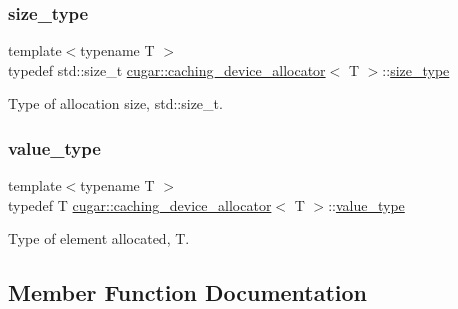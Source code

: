 \subsubsection{\texorpdfstring{size\+\_\+type}{size\_type}}
{\footnotesize\ttfamily template$<$typename T $>$ \\
typedef std\+::size\+\_\+t \hyperlink{structcugar_1_1caching__device__allocator}{cugar\+::caching\+\_\+device\+\_\+allocator}$<$ T $>$\+::\hyperlink{structcugar_1_1caching__device__allocator_a6ac404077fed53edacca4e62b15fdbe9}{size\+\_\+type}}

Type of allocation size, {\ttfamily std\+::size\+\_\+t}. \mbox{\label{structcugar_1_1caching__device__allocator_a4a03f6a7fcb58701170e501e562bf885}} 
\subsubsection{\texorpdfstring{value\+\_\+type}{value\_type}}
{\footnotesize\ttfamily template$<$typename T $>$ \\
typedef T \hyperlink{structcugar_1_1caching__device__allocator}{cugar\+::caching\+\_\+device\+\_\+allocator}$<$ T $>$\+::\hyperlink{structcugar_1_1caching__device__allocator_a4a03f6a7fcb58701170e501e562bf885}{value\+\_\+type}}

Type of element allocated, {\ttfamily T}. 

\subsection{Member Function Documentation}
\mbox{\label{structcugar_1_1caching__device__allocator_a44bd420fa04a3112c637885f73ca53dc}} 
